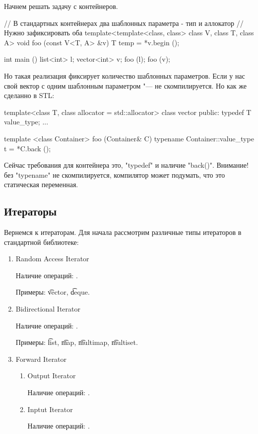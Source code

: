 Начнем решать задачу с контейнеров. 
\begin{cppcode}
// В стандартных контейнерах два шаблонных параметра - тип и аллокатор
// Нужно зафиксировать оба
template<template<class, class> class V, class T, class A>
void foo (const V<T, A> &v) {
    T temp = *v.begin ();
}

int main () {
    list<int> l; 
    vector<int> v;
    foo (l);
    foo (v); 
}
\end{cppcode}

Но такая реализация фиксирует количество шаблонных параметров.
Если у нас свой вектор с одним шаблонным параметром "--- не скомпилируется.
Но как же сделанно в STL: 
\begin{cppcode}
template<class T, class allocator = std::allocator>
class vector {
public:
    typedef T value_type; 
...
}


template <class Container>
foo (Container& C) {
    typename Container::value_type
        t = *C.back ();
}
\end{cppcode}

Сейчас требования для контейнера это, \cpp"typedef" и наличие \cpp"back()". 
Внимание! без \cpp"typename" не скомпилируется, компилятор может подумать, что это статическая переменная.


\subsection{Итераторы}
Вернемся к итераторам.
Для начала рассмотрим различные типы итераторов в стандартной библиотеке:
\begin{enumerate}
\item 
    Random Access Iterator 

    Наличие операций: \cpp{*->, ++, --, -, +=, -=}.

    Примеры: \t{vector}, \t{deque}.
\item
    Bidirectional Iterator

    Наличие операций: \cpp{*->, ++, --}.

    Примеры: \t{list}, \t{map}, \t{multimap}, \t{multiset}.
\item
    Forward Iterator 
    \begin{enumerate}
    \item
        Output Iterator

        Наличие операций: .
    \item
        Inptut Iterator

        Наличие операций: .
    \end{enumerate}
\end{enumerate}


